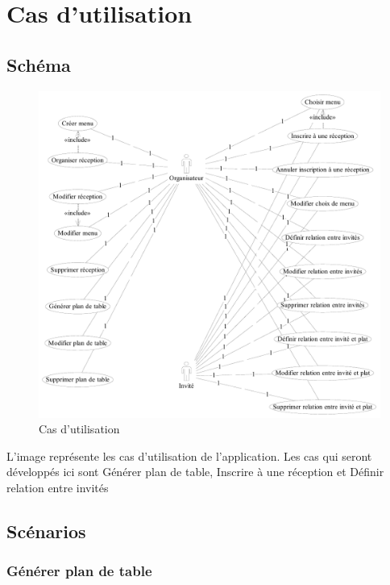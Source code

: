 \chapter{Cas d'utilisation}

\section{Schéma}

\begin{figure}
  \centering
  \includegraphics[scale=.88]{IMG/use_cases}
  \caption{Cas d'utilisation}
  \label{img_use_cases}
\end{figure}

L'image  représente les cas d'utilisation de l'application. Les cas qui seront développés ici sont \og{}Générer plan de table\fg{}, \og{}Inscrire à une réception\fg{} et \og{}Définir relation entre invités\fg{}

\section{Scénarios}

\subsection{Générer plan de table}

